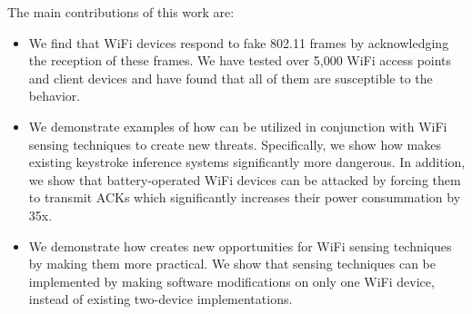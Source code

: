
The main contributions of this work are:
\begin{itemize}
    \item We find that WiFi devices respond to fake 802.11 frames by acknowledging the reception of these frames.
    We have tested over 5,000 WiFi access points and client devices and have found that all of them are susceptible to the \name behavior.
     \item We demonstrate examples of how \name can be utilized in conjunction with WiFi sensing techniques to create new threats.
    Specifically, we show how \name makes existing keystroke inference systems significantly more dangerous.
    In addition, we show that battery-operated WiFi devices can be attacked by forcing them to transmit ACKs which significantly increases their power consummation by 35x.
    
    \item We demonstrate how \name  creates new opportunities for WiFi sensing techniques by making them more practical.
    We show that sensing techniques can be implemented by making software modifications on only one WiFi device,
    instead of existing two-device implementations.
    
        
\end{itemize}